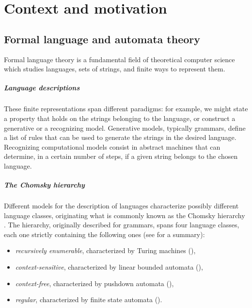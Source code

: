 \chapter{Context and motivation}



\section{Formal language and automata theory}
Formal language theory is a fundamental field of theoretical computer science which studies languages, \ie sets of strings, and finite ways to represent them.

\paragraph{Language descriptions} These finite representations span different paradigms: for example, we might state a property that holds on the strings belonging to the language, or construct a generative or a recognizing model.
Generative models, typically grammars, define a list of rules that can be used to generate the strings in the desired language.
Recognizing computational models consist in abstract machines that can determine, in a certain number of steps, if a given string belongs to the chosen language.

\paragraph{The Chomsky hierarchy} Different models for the description of languages characterize possibly different language classes, originating what is commonly known as the Chomsky hierarchy \cite{Cho56}.
The hierarchy, originally described for grammars, spans four language classes, each one strictly containing the following ones (see  for a summary):
\begin{itemize}
	\item \emph{recursively enumerable}, characterized by Turing machines (\TM),
	\item \emph{context-sensitive}, characterized by linear bounded automata (\LBA),
	\item \emph{context-free}, characterized by pushdown automata (\PDA),
	\item \emph{regular}, characterized by finite state automata (\DFA).
\end{itemize}

